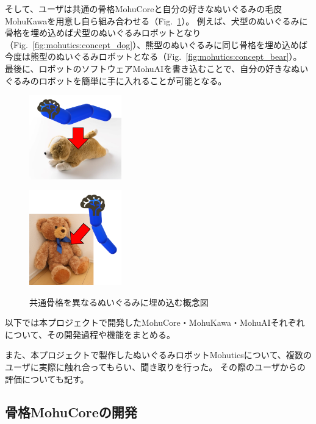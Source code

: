 \documentclass[uplatex,a4paper,12pt]{jsarticle}
\renewcommand{\figurename}{Fig.}
\newcommand{\figref}[1]{\figurename~\ref{#1}}
\begin{document}
そして、ユーザは共通の骨格MohuCoreと自分の好きなぬいぐるみの毛皮MohuKawaを用意し自ら組み合わせる（\figref{fig:mohutics:concept_embed}）。
例えば、犬型のぬいぐるみに骨格を埋め込めば犬型のぬいぐるみロボットとなり（\figref{fig:mohutics:concept_dog}）、熊型のぬいぐるみに同じ骨格を埋め込めば今度は熊型のぬいぐるみロボットとなる（\figref{fig:mohutics:concept_bear}）。
最後に、ロボットのソフトウェアMohuAIを書き込むことで、自分の好きなぬいぐるみのロボットを簡単に手に入れることが可能となる。
\begin{figure}[htbp]
  \centering
  \begin{minipage}[c]{0.48\linewidth}
    \centering
    \includegraphics[keepaspectratio,width=4cm,clip]{images/mohutics/concept_dog.png}
    \label{fig:mohutics:concept_dog}
  \end{minipage}
  \begin{minipage}[c]{0.48\linewidth}
    \centering
    \includegraphics[keepaspectratio,width=4cm,clip]{images/mohutics/concept_bear.png}
    \label{fig:mohutics:concept_bear}
  \end{minipage}
  \caption{共通骨格を異なるぬいぐるみに埋め込む概念図}
  \label{fig:mohutics:concept_embed}
\end{figure}
以下では本プロジェクトで開発したMohuCore・MohuKawa・MohuAIそれぞれについて、その開発過程や機能をまとめる。

また、本プロジェクトで製作したぬいぐるみロボットMohuticsについて、複数のユーザに実際に触れ合ってもらい、聞き取りを行った。
その際のユーザからの評価についても記す。

\subsection{骨格MohuCoreの開発}
\end{document}
